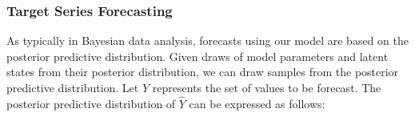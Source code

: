 \documentclass[twoside,11pt]{article}
\begin{document}




\subsubsection{Target Series Forecasting}
As typically in Bayesian data analysis, forecasts using our model are based on the posterior predictive distribution. Given draws of model parameters and latent states from their posterior distribution, we can draw samples from the posterior predictive distribution. Let $\hat{Y}$ represents the set of values to be forecast. The posterior predictive distribution of $\hat{Y}$ can be expressed as follows:
\end{document}
